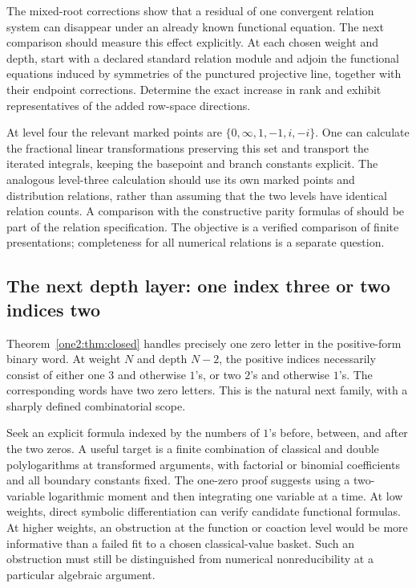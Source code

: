 The mixed-root corrections show that a residual of one convergent
relation system can disappear under an already known functional
equation. The next comparison should measure this effect explicitly.
At each chosen weight and depth, start with a declared standard
relation module and adjoin the functional equations induced by
symmetries of the punctured projective line, together with their
endpoint corrections. Determine the exact increase in rank and
exhibit representatives of the added row-space directions.

At level four the relevant marked points are
$\{0,\infty,1,-1,i,-i\}$. One can calculate the fractional linear
transformations preserving this set and transport the iterated
integrals, keeping the basepoint and branch constants explicit. The
analogous level-three calculation should use its own marked points
and distribution relations, rather than assuming that the two
levels have identical relation counts. A comparison with the
constructive parity formulas of \cite{Panzer2017,Umezawa2025} should
be part of the relation specification. The objective is a verified
comparison of finite presentations; completeness for all numerical
relations is a separate question.

\subsection{The next depth layer: one index three or two indices two}

Theorem~\ref{one2:thm:closed} handles precisely one zero letter in the
positive-form binary word. At weight $N$ and depth $N-2$, the positive
indices necessarily consist of either one $3$ and otherwise $1$'s,
or two $2$'s and otherwise $1$'s. The corresponding words have two
zero letters. This is the natural next family, with a sharply
defined combinatorial scope.

Seek an explicit formula indexed by the numbers of $1$'s before,
between, and after the two zeros. A useful target is a finite
combination of classical and double polylogarithms at transformed
arguments, with factorial or binomial coefficients and all boundary
constants fixed. The one-zero proof suggests using a two-variable
logarithmic moment and then integrating one variable at a time.
At low weights, direct symbolic differentiation can verify candidate
functional formulas. At higher weights, an obstruction at the
function or coaction level would be more informative than a failed
fit to a chosen classical-value basket. Such an obstruction must
still be distinguished from numerical nonreducibility at a
particular algebraic argument.


